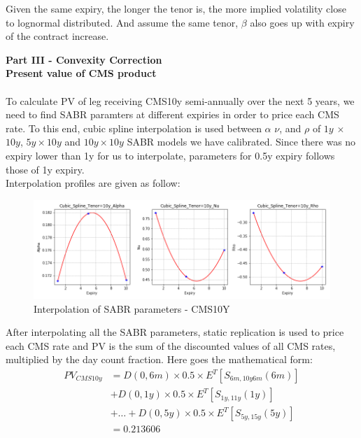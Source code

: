 \documentclass{article}
\begin{document}
\noindent Given the same expiry, the longer the tenor is, the more implied volatility close to lognormal distributed. And assume the same tenor, $\beta$ also goes up with expiry of the contract increase.

\newpage
	
\par \noindent \textbf{Part III - Convexity Correction}\\


\noindent \textbf{Present value of CMS product}	\\ \\                     
\noindent To calculate PV of leg receiving CMS10y semi-annually over the next 5 years, we need to find SABR paramters at different expiries in order to price each CMS rate. To this end, cubic spline interpolation is used between $\alpha$ $\nu$, and $\rho$ of $1y$ $\times$ $10y$, $5y\times10y$ and $10y\times10y$ SABR models we have calibrated. Since there was no expiry lower than 1y for us to interpolate, parameters for 0.5y expiry follows those of 1y expiry.\\

\noindent Interpolation profiles are given as follow:

\begin{figure}[h]
	\centering
	\includegraphics[scale=0.5]{Cubic_10y.png}
	\caption{Interpolation of SABR parameters - CMS10Y}
\end{figure}	

\noindent After interpolating all the SABR parameters, static replication is used to price each CMS rate and PV is the sum of the discounted values of all CMS rates, multiplied by the day count fraction. Here goes the mathematical form:
\begin{align*}
PV_{CMS10y}&=D(0,6m)\times 0.5 \times E^T [S_{6m,10y6m}(6m)] \\&+ D(0,1y) \times 0.5 \times E^T [S_{1y,11y}(1y)]\\&+ \dots 
+D(0,5y) \times 0.5 \times E^T [S_{5y,15y}(5y)]\\&= 0.213606
\end{align*}
\end{document}
